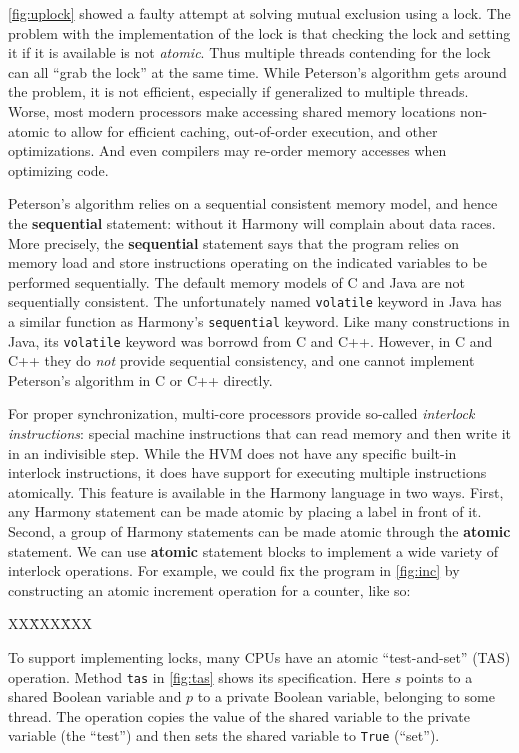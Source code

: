 \documentclass{report}
\newcommand{\harmonysource}[1]{
\begin{tabbing}
XX\=XXX\=XXX\kill
    
\end{tabbing}
}
\newenvironment{code}{
\tcolorbox
}{
\endtcolorbox
}
\begin{document}
\autoref{fig:uplock} showed a faulty attempt at solving mutual
exclusion using a lock.  The problem with the implementation of the
lock is that checking the lock and setting it if it is available is
not \emph{atomic}.  Thus multiple threads contending for the lock
can all ``grab the lock'' at the same time.  While Peterson's
algorithm gets around the problem, it is not efficient, especially
if generalized to multiple threads.
Worse, most modern processors make accessing shared memory locations
non-atomic to allow for efficient caching, out-of-order execution,
and other optimizations.
And even compilers may re-order memory accesses when optimizing code.

Peterson's algorithm relies on a sequential consistent memory model,
and hence the \textbf{sequential} statement: without it Harmony will
complain about data races.
More precisely, the \textbf{sequential} statement says that the
program relies on memory load and store instructions operating on
the indicated variables to be performed sequentially.
The default memory models of C and Java are not sequentially
consistent.
The unfortunately named \texttt{volatile} keyword in Java has
a similar function as Harmony's \texttt{sequential} keyword.
Like many constructions in Java, its \texttt{volatile} keyword
was borrowd from C and C++.
However, in C and C++ they do \emph{not} provide sequential
consistency, and one cannot implement Peterson's algorithm in
C or C++ directly.

%
For proper synchronization, multi-core processors provide so-called
\emph{interlock instructions}: %
special machine instructions
that can read memory and then write it in an indivisible step.
%
While the HVM does not have any specific built-in interlock instructions,
it does have support for executing multiple instructions atomically.
This feature is available in the Harmony language in two ways.
First, any Harmony statement can be made atomic by placing a label in front
of it.  Second, a group of Harmony statements can be made atomic
through the \textbf{atomic}
%
statement.
We can use \textbf{atomic} statement blocks to implement a wide variety of
interlock operations.
For example, we could fix the program in \autoref{fig:inc} by
constructing an atomic increment operation for a counter, like so:
\begin{code}
\harmonysource{atomicinc}
\end{code}

To support implementing locks,
many CPUs have an atomic ``test-and-set'' (TAS)
%
%
operation.
Method \texttt{tas} in \autoref{fig:tas} shows its specification.
Here $s$ points to a shared Boolean variable and $p$
to a private Boolean variable, belonging to some thread.
The operation copies the value of the shared variable to the
private variable (the ``test'')
and then sets the shared variable to \texttt{True} (``set'').
\end{document}
